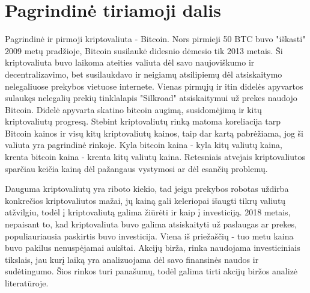 \documentclass{VUMIFInfKursinis}
\begin{document}
\section{Pagrindinė tiriamoji dalis}
Pagrindinė ir pirmoji kriptovaliuta - Bitcoin. Nors pirmieji 50 BTC buvo "iškasti" 2009 metų pradžioje, Bitcoin susilaukė didesnio dėmesio
tik 2013 metais\cite{macdonell2014popping}. Ši kriptovaliuta buvo laikoma ateities valiuta dėl savo naujoviškumo ir decentralizavimo, bet susilaukdavo ir 
neigiamų atsilipiemų dėl atsiskaitymo nelegaliuose prekybos vietuose internete. 
Vienas pirmųjų ir itin didelės apyvartos sulaukęs nelegalių prekių tinklalapis "Silkroad" atsiskaitymui už prekes naudojo Bitcoin.
Didelė apyvarta skatino bitcoin augimą, susidomėjimą ir kitų kriptovaliutų progresą.
Stebint kriptovaliutų rinką matoma koreliacija tarp Bitcoin kainos ir visų kitų kriptovaliutų kainos, taip dar kartą pabrėžiama, jog ši valiuta yra pagrindinė rinkoje.
Kyla bitcoin kaina - kyla kitų valiutų kaina, krenta bitcoin kaina - krenta kitų valiutų kaina. Retesniais atvejais kriptovaliutos sparčiau keičia kainą dėl 
pažangaus vystymosi ar dėl esančių problemų. 

Dauguma kriptovaliutų yra riboto kiekio, tad jeigu prekybos robotas uždirba konkrečios kriptovaliutos mažai, jų kainą gali keleriopai išaugti 
tikrų valiutų atžvilgiu, todėl į kriptovaliutą galima žiūrėti ir kaip į investiciją. 2018 metais, nepaisant to, kad kriptovaliuta buvo galima 
atsiskaityti už paslaugas ar prekes, populiauriausia paskirtis buvo investicija. Viena iš priežaščių - tuo metu kaina buvo pakilus nenuspėjamai
aukštai\cite{garg2018autoregressive}. Akcijų birža, rinka naudojama investiciniais tikslais, jau kurį laiką yra analizuojama dėl savo finansinės
naudos ir sudėtingumo. Šios rinkos turi panašumų, todėl galima tirti akcijų biržos analizė literatūroje.
\end{document}
